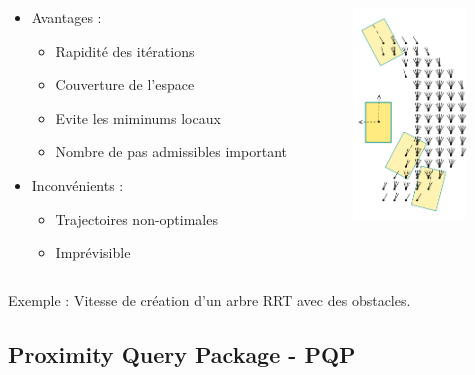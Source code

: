 \documentclass{beamer}
\begin{document}
\begin{frame}
  \begin{columns}
    \begin{column}{7cm}
      \begin{itemize}
      \item Avantages :
        \begin{itemize}
        \item Rapidité des itérations
        \item Couverture de l'espace
        \item Evite les miminums locaux
        \item Nombre de pas admissibles important
        \end{itemize}
        \vspace{3mm}
      \item Inconvénients :
        \begin{itemize}
        \item Trajectoires non-optimales
        \item Imprévisible
        \end{itemize}
      \end{itemize}
    \end{column}

    \begin{column}{4cm}
      \includegraphics[width=3cm]{./images/grid_simple.png}
    \end{column}
  \end{columns}

  \vspace{5mm}
  Exemple : Vitesse de création d'un arbre RRT avec des obstacles.
\end{frame}


\subsection{Proximity Query Package - PQP}
\end{document}
